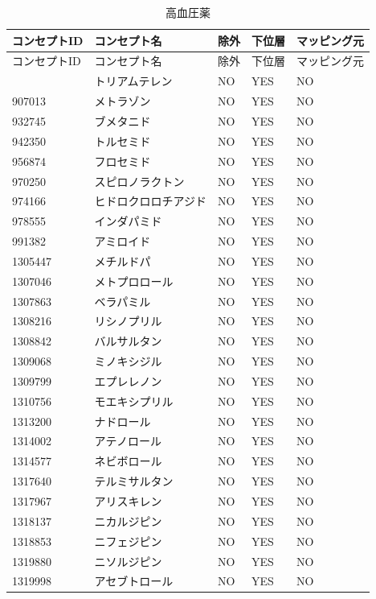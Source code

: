 \documentclass[
  11pt]{book}
\theoremstyle{definition}
\theoremstyle{definition}
\theoremstyle{definition}
\theoremstyle{definition}
\theoremstyle{remark}
\begin{document}
\begin{longtable}[]{@{}lllll@{}}
\caption{\label{tab:HTN1yrFODrugs} 高血圧薬}\tabularnewline
\toprule\noalign{}
コンセプトID & コンセプト名 & 除外 & 下位層 & マッピング元 \\
\midrule\noalign{}
\endfirsthead
\toprule\noalign{}
コンセプトID & コンセプト名 & 除外 & 下位層 & マッピング元 \\
\midrule\noalign{}
\endhead
\bottomrule\noalign{}
\endlastfoot
904542 & トリアムテレン & NO & YES & NO \\
907013 & メトラゾン & NO & YES & NO \\
932745 & ブメタニド & NO & YES & NO \\
942350 & トルセミド & NO & YES & NO \\
956874 & フロセミド & NO & YES & NO \\
970250 & スピロノラクトン & NO & YES & NO \\
974166 & ヒドロクロロチアジド & NO & YES & NO \\
978555 & インダパミド & NO & YES & NO \\
991382 & アミロイド & NO & YES & NO \\
1305447 & メチルドパ & NO & YES & NO \\
1307046 & メトプロロール & NO & YES & NO \\
1307863 & ベラパミル & NO & YES & NO \\
1308216 & リシノプリル & NO & YES & NO \\
1308842 & バルサルタン & NO & YES & NO \\
1309068 & ミノキシジル & NO & YES & NO \\
1309799 & エプレレノン & NO & YES & NO \\
1310756 & モエキシプリル & NO & YES & NO \\
1313200 & ナドロール & NO & YES & NO \\
1314002 & アテノロール & NO & YES & NO \\
1314577 & ネビボロール & NO & YES & NO \\
1317640 & テルミサルタン & NO & YES & NO \\
1317967 & アリスキレン & NO & YES & NO \\
1318137 & ニカルジピン & NO & YES & NO \\
1318853 & ニフェジピン & NO & YES & NO \\
1319880 & ニソルジピン & NO & YES & NO \\
1319998 & アセブトロール & NO & YES & NO \\

\end{longtable}
\end{document}
